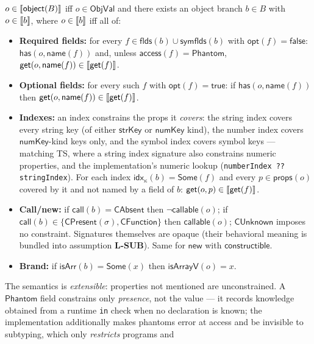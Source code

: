 \documentclass[11pt]{article}
\newcommand{\ObjVal}{\mathsf{ObjVal}}
\begin{document}
\begin{definition}
\label{def:object-semantics}
$o \in \llbracket \mathsf{object}(B) \rrbracket$ iff $o \in \ObjVal$ and there exists an
object branch $b \in B$ with $o \in \llbracket b \rrbracket$, where $o \in \llbracket b \rrbracket$ iff all
of:
\begin{itemize}
\item \textbf{Required fields:} for every $f \in
  \mathsf{flds}(b) \cup \mathsf{symflds}(b)$ with
  $\mathsf{opt}(f) = \mathsf{false}$: $\mathsf{has}(o, \mathsf{name}(f))$ and,
  unless $\mathsf{access}(f) = \mathsf{Phantom}$,
  $\mathsf{get}(o, \mathsf{name}(f)) \in \llbracket \mathsf{get}(f) \rrbracket$.
\item \textbf{Optional fields:} for every such $f$ with
  $\mathsf{opt}(f) = \mathsf{true}$: if $\mathsf{has}(o, \mathsf{name}(f))$
  then $\mathsf{get}(o, \mathsf{name}(f)) \in \llbracket \mathsf{get}(f) \rrbracket$.
\item \textbf{Indexes:} an index constrains the props it \emph{covers}:
  the string index covers every string key (of either $\mathsf{strKey}$ or
  $\mathsf{numKey}$ kind), the number index covers $\mathsf{numKey}$-kind
  keys only, and the symbol index covers symbol keys — matching TS, where a
  string index signature also constrains numeric properties, and the
  implementation's numeric lookup (\texttt{numberIndex}~\texttt{??}
  \texttt{stringIndex}). For each index
  $\mathsf{idx}_\kappa(b) = \mathsf{Some}(f)$ and every
  $p \in \mathsf{props}(o)$ covered by it and not named by a field of $b$:
  $\mathsf{get}(o, p) \in \llbracket \mathsf{get}(f) \rrbracket$.
\item \textbf{Call/new:} if $\mathsf{call}(b) = \mathsf{CAbsent}$ then
  $\neg\mathsf{callable}(o)$; if $\mathsf{call}(b) \in
  \{\mathsf{CPresent}(\sigma), \mathsf{CFunction}\}$ then
  $\mathsf{callable}(o)$; $\mathsf{CUnknown}$ imposes no constraint.
  Signatures themselves are opaque (their behavioral meaning is
  bundled into assumption \textbf{L-SUB}). Same for $\mathsf{new}$ with
  $\mathsf{constructible}$.
\item \textbf{Brand:} if $\mathsf{isArr}(b) = \mathsf{Some}(x)$ then
  $\mathsf{isArrayV}(o) = x$.
\end{itemize}
The semantics is \emph{extensible}: properties not mentioned are
unconstrained. A
$\mathsf{Phantom}$ field constrains only \emph{presence}, not the value — it
records knowledge obtained from a runtime \texttt{in} check when no
declaration is known; the implementation additionally makes phantoms error at
access and be invisible to subtyping, which only \emph{restricts} programs and

\end{definition}
\end{document}
